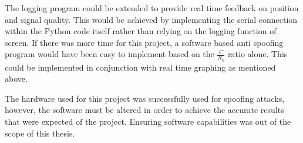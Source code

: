 The logging program could be extended to provide real time feedback on position and signal quality. This would be achieved by implementing the serial connection within
the Python code itself rather than relying on the logging function of screen.
If there was more time for this project, a software based anti spoofing program would have been easy to implement based
on the $\frac{C}{N_0}$ ratio alone. This could be implemented in conjunction with real time graphing as mentioned above.

The hardware used for this project was successfully used for spoofing attacks, however, the software must be altered in order to achieve the accurate results that were
expected of the project. Ensuring software capabilities was out of the scope of this thesis.